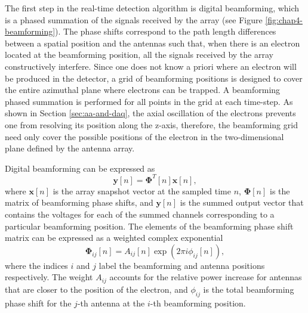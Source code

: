 The first step in the real-time detection algorithm is digital beamforming, which is a phased summation of the signals received by the array (see Figure \ref{fig:chap4-beamforming}). The phase shifts correspond to the path length differences between a spatial position and the antennas such that, when there is an electron located at the beamforming position, all the signals received by the array constructively interfere. Since one does not know a priori where an electron will be produced in the detector, a grid of beamforming positions is designed to cover the entire azimuthal plane where electrons can be trapped. A beamforming phased summation is performed for all points in the grid at each time-step. As shown in Section \ref{sec:aa-and-daq}, the axial oscillation of the electrons prevents one from resolving its position along the z-axis, therefore, the beamforming grid need only cover the possible positions of the electron in the two-dimensional plane defined by the antenna array. 

Digital beamforming can be expressed as
\begin{equation}
    \mathbf{y}[n] = \mathbf{\Phi}^T[n]\mathbf{x}[n],
    \label{eq:beamforming}
\end{equation}
where $\mathbf{x}[n]$ is the array snapshot vector at the sampled time $n$, $\mathbf{\Phi}[n]$ is the matrix of beamforming phase shifts, and $\mathbf{y}[n]$ is the summed output vector that contains the voltages for each of the summed channels corresponding to a particular beamforming position. %
The elements of the beamforming phase shift matrix can be expressed as a weighted complex exponential
\begin{equation}
    \mathbf{\Phi}_{ij}[n]=A_{ij}[n]\exp{\left(2\pi i\phi_{ij}[n]\right)},
\end{equation}
where the indices $i$ and $j$ label the beamforming and antenna positions respectively. The weight $A_{ij}$ accounts for the relative power increase for antennas that are closer to the position of the electron, and $\phi_{ij}$ is the total beamforming phase shift for the $j$-th antenna at the $i$-th beamforming position.

